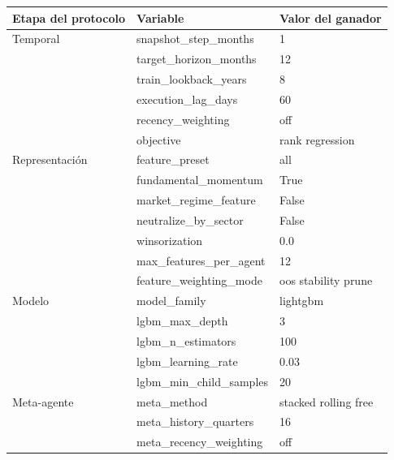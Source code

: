 \begin{tabular}{lll}
\toprule
Etapa del protocolo & Variable & Valor del ganador \\
\midrule
Temporal & snapshot\_step\_months & 1 \\
 & target\_horizon\_months & 12 \\
 & train\_lookback\_years & 8 \\
 & execution\_lag\_days & 60 \\
 & recency\_weighting & off \\
 & objective & rank regression \\
Representación & feature\_preset & all \\
 & fundamental\_momentum & True \\
 & market\_regime\_feature & False \\
 & neutralize\_by\_sector & False \\
 & winsorization & 0.0 \\
 & max\_features\_per\_agent & 12 \\
 & feature\_weighting\_mode & oos stability prune \\
Modelo & model\_family & lightgbm \\
 & lgbm\_max\_depth & 3 \\
 & lgbm\_n\_estimators & 100 \\
 & lgbm\_learning\_rate & 0.03 \\
 & lgbm\_min\_child\_samples & 20 \\
Meta-agente & meta\_method & stacked rolling free \\
 & meta\_history\_quarters & 16 \\
 & meta\_recency\_weighting & off \\
\bottomrule
\end{tabular}
